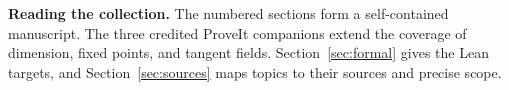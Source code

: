 \documentclass[11pt,letterpaper]{article}
\theoremstyle{proved}
\theoremstyle{definition}
\begin{document}
\hypersetup{pageanchor=true,bookmarksdepth=2}
\setcounter{page}{2}
\tableofcontents
\medskip
\noindent\textbf{Reading the collection.} The numbered sections form a self-contained manuscript. The three credited ProveIt companions extend the coverage of dimension, fixed points, and tangent fields. Section~\ref{sec:formal} gives the Lean targets, and Section~\ref{sec:sources} maps topics to their sources and precise scope.
\newpage















\end{document}
